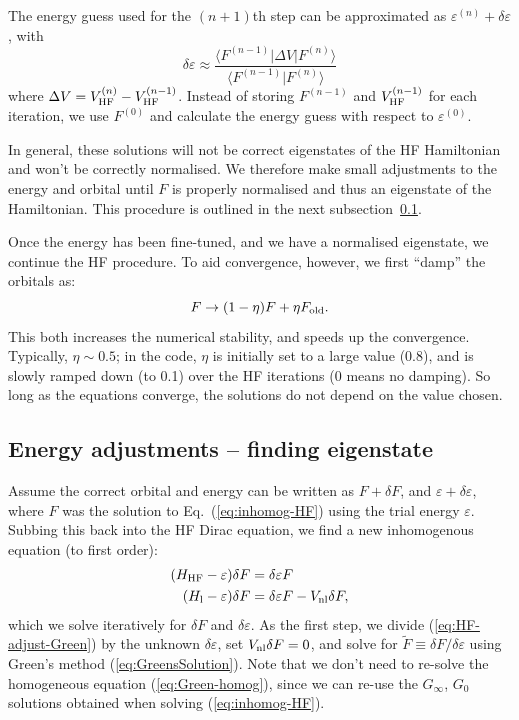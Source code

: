 \documentclass[10pt,twocolumn,a4paper]{article}%
\newcommand{\bra}[1]{\ensuremath{\langle #1|}}	%
\newcommand{\ket}[1]{\ensuremath{|#1\rangle}}	%
\newcommand{\braket}[1]{\ensuremath{\langle #1\rangle}}	%
\newcommand{\be}{\begin{equation}}
\newcommand{\ee}{\end{equation}}
\def\en{\ensuremath{\varepsilon}}
\begin{document}
The energy guess used for the $(n+1)$th step can be approximated as $\en^{(n)}+\delta\en$, with
\be
\delta\en \approx  \frac{\bra{F^{(n-1)}} \Delta V \ket{F^{(n)}}}{\braket{F^{(n-1)}|F^{(n)}}}
\ee
where $\Delta V = V_{\rm HF}^{(n)} - V_{\rm HF}^{(n-1)}$.
Instead of storing $F^{(n-1)}$ and $V_{\rm HF}^{(n-1)}$ for each iteration, we use $F^{(0)}$ and calculate the energy guess with respect to $\en^{(0)}$.

In general, these solutions will not be correct eigenstates of the HF Hamiltonian and won't be correctly normalised.
We therefore make small adjustments to the energy and orbital until $F$ is properly normalised and thus an eigenstate of the Hamiltonian.
This procedure is outlined in the next subsection~\ref{sec:hf-adjustEn}.

Once the energy has been fine-tuned, and we have a normalised eigenstate, we continue the HF procedure.
To aid convergence, however, we first ``damp'' the orbitals as:
\be
F \to (1-\eta)F+ \eta F_{\rm old}.
\ee
This both increases the numerical stability, and speeds up the convergence. %
Typically, $\eta\sim0.5$; in the code, $\eta$ is initially set to a large value (0.8), and is slowly ramped down (to 0.1) over the HF iterations (0 means no damping).
So long as the equations converge, the solutions do not depend on the value chosen.










\subsection{Energy adjustments -- finding eigenstate}\label{sec:hf-adjustEn}




Assume the correct orbital and energy can be written as
$F +  \delta F$, and
$\en + \delta\en $,
where $F$ was the solution to Eq.~(\ref{eq:inhomog-HF}) using the trial energy $\en$.
Subbing this back into the HF Dirac equation, we find a new inhomogenous equation (to first order):
\begin{align}
(H_{\rm HF} - \en) \delta F &=  \delta\en F  \\
(H_{\rm l} - \en) \delta F &=  \delta\en F  - V_{\rm nl} \delta F,  \label{eq:HF-adjust-Green}
\end{align}
which we solve iteratively for $\delta F$ and $\delta \en$.
As the first step, we divide (\ref{eq:HF-adjust-Green}) by the unknown $\delta\en$, set $V_{\rm nl} \delta F=0$, and solve for $\tilde F\equiv\delta F/\delta\en$ using Green's method (\ref{eq:GreensSolution}).
Note that we don't need to re-solve the homogeneous equation (\ref{eq:Green-homog}), since we can re-use the $G_\infty$, $G_0$
solutions obtained when solving (\ref{eq:inhomog-HF}).
\end{document}
